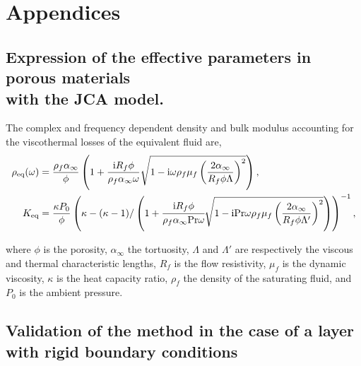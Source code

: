 \begingroup
\section{Appendices}
\renewcommand{\thesubsection}{\thesection.\Alph{subsection}}
\begin{widetext}
\subsection[Expressions of the porous effective parameters with the JCA model.]
    {\texorpdfstring{Expression of the effective parameters in porous materials \\ with the JCA model.}
    {Expression of the effective parameters in porous materials with the JCA model.}}

\label{app:jca}

The complex and frequency dependent density and bulk modulus accounting for the viscothermal losses of the equivalent fluid \cite{johnson1987,champoux1991} are,
\begin{equation}
\begin{aligned}
 \rho_{\text{eq}}(\omega) &= \frac{\rho_{f} \alpha_{\infty}}{\phi}\left(1+\frac{\mathrm i R_f \phi}{\rho_f \alpha_\infty\omega} \sqrt{1- \mathrm i  \omega  \rho_{f} \mu_f \left(\frac{ 2\alpha_{\infty}}{R_f \phi \Lambda}\right)^2 }\right),\\
K_{\text{eq}} &=\frac{\kappa P_{0}}{\phi}\left(\kappa-(\kappa-1)/\left(1+ \cfrac{\mathrm i R_f \phi}{\rho_f \alpha_\infty\text{Pr} \omega} \sqrt{1- \mathrm i\text{Pr} \omega \rho_{f} \mu_f\left( \frac{ 2\alpha_{\infty}}{R_f \phi \Lambda^{\prime}}\right)^2 }\right)\right)^{-1}, 
\end{aligned}
\end{equation}
\end{widetext}

where $\phi$ is the porosity, $\alpha_{\infty}$ the tortuosity, $\Lambda$ and $\Lambda'$ are respectively the viscous and thermal characteristic lengths, $R_f$ is the flow resistivity, $\mu_f$ is the dynamic viscosity, $\kappa$ is the heat capacity ratio, $\rho_f$ the density of the saturating fluid, and $P_0$ is the ambient pressure.


\subsection{Validation of the method in the case of a layer with rigid boundary conditions}
\label{app:neumann_bc}

